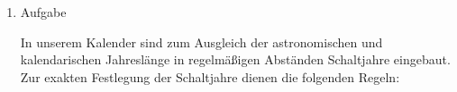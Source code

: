 \documentclass[12pt,a4paper]{scrreprt}
\begin{document}
\begin{enumerate}
\begin{comment}
    \begin{flussdiagramm}
      \begin{while}{!(0<=tag1)}
        
      \end{while}
      \begin{while}{!(0<=h1)}
        
      \end{while}
      \begin{while}{!(0<=min1<60)}
        
      \end{while}
      \begin{while}{!(0<=sec1<60)}
        
      \end{while}
      \begin{while}{!(0<=msec1<1000)}
        
      \end{while}
      \begin{while}{!(0<=tag2)}
        
      \end{while}
      \begin{while}{!(0<=h2)}
        
      \end{while}
      \begin{while}{!(0<=min2<60)}
        
      \end{while}
      \begin{while}{!(0<=sec2<60)}
        
      \end{while}
      \begin{while}{!(0<=msec2<1000)}
        
      \end{while}
      \command{t=tag1+tag2}
      \command{h=h1+h2}
      \command{m=min1+min2}
      \command{s=sec1+sec2}
      \command{n=msec1+msec2}
      \command{sum=n+s*1000+m*60000+h*3600000+t*24*3600000}
      \command{t=sum/(24*3600000)}
      \command{sum=sum mod (24*3600000)}
      \command{h=sum/(3600000)}
      \command{sum=sum mod (3600000)}
      \command{m=sum/(60000)}
      \command{sum=sum mod (60000)}
      \command{n=sum/(1000)}
      \output{Tage: t, Stunden: h, Minuten: m, Sekunden: m, Millisekunden: n}
    \end{flussdiagramm}
\end{comment}

\item Aufgabe %

In unserem Kalender sind zum Ausgleich der astronomischen und kalendarischen Jahreslänge in regelmäßigen Abständen Schaltjahre eingebaut. Zur exakten Festlegung der Schaltjahre dienen die folgenden Regeln:


\end{enumerate}
\end{document}
